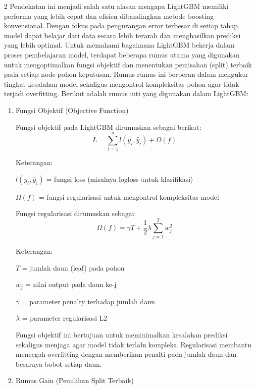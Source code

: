 \documentclass[12pt, a4paper, onecolumn, oneside]{report}
\begin{document}
\begin{spacing}{2}
Pendekatan ini menjadi salah satu alasan mengapa LightGBM memiliki performa yang lebih cepat dan efisien dibandingkan metode boosting konvensional. Dengan fokus pada pengurangan error terbesar di setiap tahap, model dapat belajar dari data secara lebih terarah dan menghasilkan prediksi yang lebih optimal. Untuk memahami bagaimana LightGBM bekerja dalam proses pembelajaran model, terdapat beberapa rumus utama yang digunakan untuk mengoptimalkan fungsi objektif dan menentukan pemisahan (split) terbaik pada setiap node pohon keputusan. Rumus-rumus ini berperan dalam mengukur tingkat kesalahan model sekaligus mengontrol kompleksitas pohon agar tidak terjadi overfitting. Berikut adalah rumus inti yang digunakan dalam LightGBM:

\begin{enumerate}
    \item Fungsi Objektif (Objective Function)
    
    Fungsi objektif pada LightGBM dirumuskan sebagai berikut:
    \begin{equation}
        L = \sum_{i=1}^{n} l(y_i, \hat{y}_i) + \Omega(f)
    \end{equation}
    
    Keterangan:
    
    $l(y_i, \hat{y}_i)$ = fungsi loss (misalnya logloss untuk klasifikasi)
    
    $\Omega(f)$ = fungsi regularisasi untuk mengontrol kompleksitas model
    
    Fungsi regularisasi dirumuskan sebagai:
    \begin{equation}
        \Omega(f) = \gamma T + \frac{1}{2} \lambda \sum_{j=1}^{T} w_j^2
    \end{equation}
    
    Keterangan:
    
    $T$ = jumlah daun (leaf) pada pohon
    
    $w_j$ = nilai output pada daun ke-j
    
    $\gamma$ = parameter penalty terhadap jumlah daun
    
    $\lambda$ = parameter regularisasi L2
    
    Fungsi objektif ini bertujuan untuk meminimalkan kesalahan prediksi sekaligus menjaga agar model tidak terlalu kompleks. Regularisasi membantu mencegah overfitting dengan memberikan penalti pada jumlah daun dan besarnya bobot setiap daun.
    
    \item Rumus Gain (Pemilihan Split Terbaik)
    

\end{enumerate}
\end{spacing}
\end{document}
